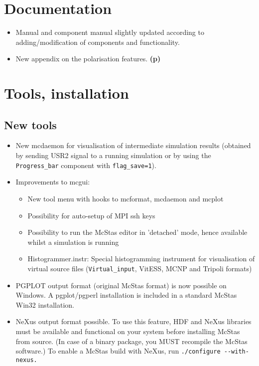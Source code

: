 \section{Documentation}
\label{s:new-features:documentation}
\begin{itemize}
\item Manual and component manual slightly updated according to
  adding/modification of components and functionality.
\item New appendix on the polarisation features. {\bf(p)}
\end{itemize}

\section{Tools, installation}
\label{s:new-features:tools}
\subsection{New tools}
\begin{itemize}
  \item New mcdaemon for visualisation of intermediate simulation results (obtained by sending USR2 signal to a 
    running simulation or by using the \verb+Progress_bar+ component with \verb+flag_save=1+).
  \item Improvements to mcgui:
    \begin{itemize}
      \item New tool menu with hooks to mcformat, mcdaemon and mcplot
      \item Possibility for auto-setup of MPI ssh keys
      \item Possibility to run the McStas editor in 'detached' mode, hence available whilst a simulation is running
      \item Histogrammer.instr: Special histogramming instrument for visualisation of virtual source files (\verb+Virtual_input+,
	VitESS, MCNP and Tripoli formats)
    \end{itemize}
  \item PGPLOT output format (original McStas format) is now possible on Windows. A pgplot/pgperl installation
    is included in a standard McStas Win32 installation.
  \item  NeXus output format possible. To use this feature, HDF and NeXus libraries must be available
    and functional on your system before installing McStas from source. (In case of a binary package, 
    you MUST recompile the McStas software.) To enable a McStas build with NeXus, run 
    \verb+./configure --with-nexus.+
\end{itemize}
